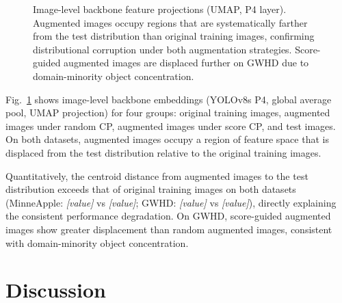 \documentclass[conference]{IEEEtran}
\begin{document}
\begin{figure}[t]
\centering
\caption{Image-level backbone feature projections (UMAP,
P4 layer). Augmented images occupy regions that are
systematically farther from the test distribution than
original training images, confirming distributional
corruption under both augmentation strategies.
Score-guided augmented images are displaced further on
GWHD due to domain-minority object concentration.}
\label{fig:feature_space}
\end{figure}

Fig.~\ref{fig:feature_space} shows image-level backbone
embeddings (YOLOv8s P4, global average pool, UMAP
projection) for four groups: original training images,
augmented images under random CP, augmented images under
score CP, and test images. On both datasets, augmented
images occupy a region of feature space that is displaced
from the test distribution relative to the original
training images.

Quantitatively, the centroid distance from augmented
images to the test distribution exceeds that of original
training images on both datasets
(MinneApple: \textit{[value]} vs \textit{[value]};
GWHD: \textit{[value]} vs \textit{[value]}),
directly explaining the consistent performance
degradation. On GWHD, score-guided augmented images show
greater displacement than random augmented images,
consistent with domain-minority object concentration.

\section{Discussion}
\end{document}
